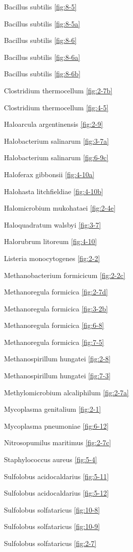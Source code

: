 \documentclass[]{tufte-book}
\begin{document}
Bacillus subtilis \ref{fig:8-5}

Bacillus subtilis \ref{fig:8-5a}

Bacillus subtilis \ref{fig:8-6}

Bacillus subtilis \ref{fig:8-6a}

Bacillus subtilis \ref{fig:8-6b}

Clostridium thermocellum \ref{fig:2-7b}

Clostridium thermocellum \ref{fig:4-5}

Haloarcula argentinensis \ref{fig:2-9}

Halobacterium salinarum \ref{fig:3-7a}

Halobacterium salinarum \ref{fig:6-9c}

Haloferax gibbonsii \ref{fig:4-10a}

Halohasta litchfieldiae \ref{fig:4-10b}

Halomicrobium mukohataei \ref{fig:2-4e}

Haloquadratum walsbyi \ref{fig:3-7}

Halorubrum litoreum \ref{fig:4-10}

Listeria monocytogenes \ref{fig:2-2}

Methanobacterium formicicum \ref{fig:2-2c}

Methanoregula formicica \ref{fig:2-7d}

Methanoregula formicica \ref{fig:3-2b}

Methanoregula formicica \ref{fig:6-8}

Methanoregula formicica \ref{fig:7-5}

Methanospirillum hungatei \ref{fig:2-8}

Methanospirillum hungatei \ref{fig:7-3}

Methylomicrobium alcaliphilum \ref{fig:2-7a}

Mycoplasma genitalium \ref{fig:2-1}

Mycoplasma pneumoniae \ref{fig:6-12}

Nitrosopumilus maritimus \ref{fig:2-7c}

Staphylococcus aureus \ref{fig:5-4}

Sulfolobus acidocaldarius \ref{fig:5-11}

Sulfolobus acidocaldarius \ref{fig:5-12}

Sulfolobus solfataricus \ref{fig:10-8}

Sulfolobus solfataricus \ref{fig:10-9}

Sulfolobus solfataricus \ref{fig:2-7}
\end{document}
